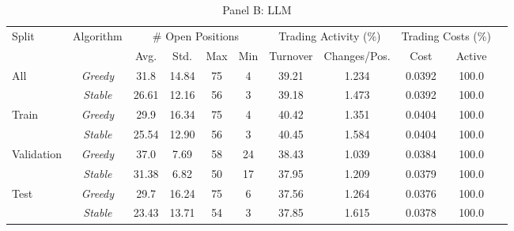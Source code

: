 \begin{table}[htbp]
\begin{subtable}{\textwidth}
\caption{Panel B: LLM}
\centering
{\small
\begin{tabular}{lcccccccccc}
\toprule
Split & Algorithm & \multicolumn{4}{c}{\# Open Positions} & \multicolumn{2}{c}{Trading Activity (\%)} & \multicolumn{2}{c}{Trading Costs (\%)} \\
\cmidrule(lr{0.6em}){3-6} \cmidrule(lr{0.6em}){7-8} \cmidrule(lr{0.6em}){9-10}
& & Avg. & Std. & Max & Min & Turnover & Changes/Pos. & Cost & Active \\
\midrule
\multirow{2}{*}{All} & \textit{Greedy} & 31.8 & 14.84 & 75 & 4 & 39.21 & 1.234 & 0.0392 & 100.0 \\
 & \textit{Stable} & 26.61 & 12.16 & 56 & 3 & 39.18 & 1.473 & 0.0392 & 100.0 \\
\midrule
\multirow{2}{*}{Train} & \textit{Greedy} & 29.9 & 16.34 & 75 & 4 & 40.42 & 1.351 & 0.0404 & 100.0 \\
 & \textit{Stable} & 25.54 & 12.90 & 56 & 3 & 40.45 & 1.584 & 0.0404 & 100.0 \\
\midrule
\multirow{2}{*}{Validation} & \textit{Greedy} & 37.0 & 7.69 & 58 & 24 & 38.43 & 1.039 & 0.0384 & 100.0 \\
 & \textit{Stable} & 31.38 & 6.82 & 50 & 17 & 37.95 & 1.209 & 0.0379 & 100.0 \\
\midrule
\multirow{2}{*}{Test} & \textit{Greedy} & 29.7 & 16.24 & 75 & 6 & 37.56 & 1.264 & 0.0376 & 100.0 \\
 & \textit{Stable} & 23.43 & 13.71 & 54 & 3 & 37.85 & 1.615 & 0.0378 & 100.0 \\
\bottomrule
\end{tabular}
}
\end{subtable}
\end{table}
